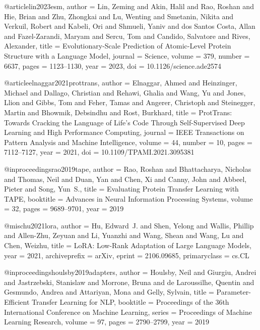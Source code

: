 \documentclass{article}
\begin{document}
@article{lin2023esm,
  author    = {Lin, Zeming and Akin, Halil and Rao, Roshan and
               Hie, Brian and Zhu, Zhongkai and Lu, Wenting and
               Smetanin, Nikita and Verkuil, Robert and Kabeli, Ori and
               Shmueli, Yaniv and {dos Santos Costa}, Allan and
               Fazel-Zarandi, Maryam and Sercu, Tom and
               Candido, Salvatore and Rives, Alexander},
  title     = {Evolutionary-Scale Prediction of Atomic-Level Protein
               Structure with a Language Model},
  journal   = {Science},
  volume    = {379},
  number    = {6637},
  pages     = {1123--1130},
  year      = {2023},
  doi       = {10.1126/science.ade2574}
}

@article{elnaggar2021prottrans,
  author    = {Elnaggar, Ahmed and Heinzinger, Michael and Dallago, Christian and
               Rehawi, Ghalia and Wang, Yu and Jones, Llion and Gibbs, Tom and
               Feher, Tamas and Angerer, Christoph and Steinegger, Martin and
               Bhowmik, Debsindhu and Rost, Burkhard},
  title     = {{ProtTrans}: Towards Cracking the Language of Life's Code Through
               Self-Supervised Deep Learning and High Performance Computing},
  journal   = {{IEEE} Transactions on Pattern Analysis and Machine Intelligence},
  volume    = {44},
  number    = {10},
  pages     = {7112--7127},
  year      = {2021},
  doi       = {10.1109/TPAMI.2021.3095381}
}

@inproceedings{rao2019tape,
  author    = {Rao, Roshan and Bhattacharya, Nicholas and Thomas, Neil and
               Duan, Yan and Chen, Xi and Canny, John and Abbeel, Pieter and
               Song, Yun~S.},
  title     = {Evaluating Protein Transfer Learning with {TAPE}},
  booktitle = {Advances in Neural Information Processing Systems},
  volume    = {32},
  pages     = {9689--9701},
  year      = {2019}
}


@misc{hu2021lora,
  author        = {Hu, Edward~J. and Shen, Yelong and Wallis, Phillip and
                   Allen-Zhu, Zeyuan and Li, Yuanzhi and Wang, Shean and
                   Wang, Lu and Chen, Weizhu},
  title         = {{LoRA}: Low-Rank Adaptation of Large Language Models},
  year          = {2021},
  archiveprefix = {arXiv},
  eprint        = {2106.09685},
  primaryclass  = {cs.CL}
}

@inproceedings{houlsby2019adapters,
  author    = {Houlsby, Neil and Giurgiu, Andrei and Jastrzebski, Stanislaw and
               Morrone, Bruna and {de Laroussilhe}, Quentin and Gesmundo, Andrea and
               Attariyan, Mona and Gelly, Sylvain},
  title     = {Parameter-Efficient Transfer Learning for {NLP}},
  booktitle = {Proceedings of the 36th International Conference on Machine Learning},
  series    = {Proceedings of Machine Learning Research},
  volume    = {97},
  pages     = {2790--2799},
  year      = {2019}
}
\end{document}

